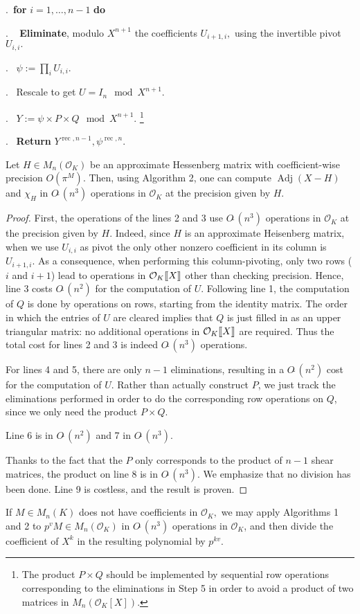 \documentclass{sig-alternate-05-2015}
\DeclareMathOperator{\adj}{Adj}
\DeclareMathOperator{\rec}{rec}
\newcommand{\OK}{\mathcal{O}_K}
\newcommand{\llb}{[\mkern-2.5mu[}
\newcommand{\rrb}{]\mkern-2.5mu]}
\newcommand{\softO}{O\tilde{~}}
\begin{document}
.\    {\bf for} $i=1,\dots,n-1$ {\bf do} 

. \  \:  \textbf{Eliminate}, modulo $X^{n+1}$ the coefficients $U_{i+1,i},$
using the invertible pivot $U_{i,i}.$

. \ $\psi:=\prod_i U_{i,i}.$

. \ Rescale to get $U = I_n \mod X^{n+1}.$

. \ $Y:=\psi \times P \times Q   \mod X^{n+1}.$ \footnote{The product $P \times Q$
should be implemented by sequential row operations corresponding to the eliminations in Step 5
in order to avoid a product of two matrices in $M_n(\OK[X])$.}

. \ \textbf{Return} $Y^{\rec,n-1}, \psi^{\rec,n}.$

\vspace{-1ex}\noindent\hrulefill

\medskip

\begin{theo}
Let $H \in M_n(\OK)$ be an approximate Hessenberg matrix with
coefficient-wise precision $O(\pi^M).$
Then, using Algorithm 2, one can compute $\adj (X -H)$
and $\chi_H$ in 
$\softO (n^3)$ operations in $\OK$ at the precision given by $H.$
\end{theo}
\begin{proof}
First, the operations of the lines 2 and 3 use $\softO (n^3)$ operations
in $\OK$ at the precision given by $H.$
Indeed, since $H$ is an approximate Heisenberg matrix, when we use $U_{i,i}$ as pivot
the only other nonzero coefficient in its column is $U_{i+1,i}$.
As a consequence, when performing this column-pivoting, only two rows ($i$ and
$i+1$) lead to operations in $\OK \llb X \rrb$ other than checking precision.
Hence, line 3 costs $\softO (n^2)$ for the computation of $U.$
Following line 1, the computation of $Q$ is done by operations on rows, starting from the identity matrix.
The order in which the entries of $U$ are cleared implies that $Q$ is just filled in as an upper triangular matrix:
no additional operations in $\OK\llb X\rrb$ are required. Thus the total cost
for lines 2 and 3 is indeed $\softO (n^3)$ operations.

For lines 4 and 5, there are only $n-1$ eliminations, resulting in a $\softO (n^2)$ cost
for the computation of $U.$ Rather than actually construct $P$, we just track the eliminations
performed in order to do the corresponding row operations on $Q$, since we only need the product $P \times Q$.

Line 6 is in $\softO (n^2)$ and 7 in $\softO (n^3).$

Thanks to the fact that the $P$ only corresponds to the product of $n-1$ 
shear matrices, the
product on line 8 is in $\softO (n^3).$
We emphasize that no division has been done.
Line 9 is costless, and the result is proven.
\end{proof}
\begin{rem}
If $M \in M_n(K)$ does not have coefficients in $\OK,$
we may apply Algorithms 1 and 2 to $p^v M \in M_n(\OK)$
in $\softO (n^3)$ operations in $\OK$, and then divide
the coefficient of $X^k$ in the resulting polynomial by $p^{kv}$.
\end{rem}
\end{document}
